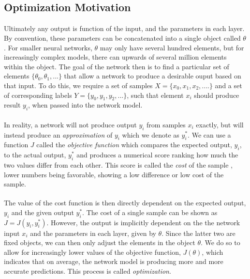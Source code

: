 \documentclass[12pt,letterpaper]{article}
\begin{document}
\subsection{Optimization Motivation}

\paragraph*{}Ultimately any output is function of the input, and the parameters in each layer. By convention, these parameters can be concatenated into a single object called $\theta$. For smaller neural networks, $\theta$ may only have several hundred elements, but for increasingly complex models, there can upwards of several million elements within the object. The goal of the network then is to find a particular set of elements $\{ \theta_0 , \theta_1 , ... \}$ that allow a network to produce a desirable ouput based on that input. To do this, we require a set of samples $X = \{x_0,x_1,x_2,....\}$ and a set of corresponding labels 
$Y = \{y_0,y_1,y_2,...\}$, such that element $x_i$ should produce result $y_i$, when passed into the network model. 

\paragraph*{}In reality, a network will not produce output $y_i$ from samples $x_i$ exactly, but will instead produce an \textit{approximation} of $y_i$ which we denote as $y_i^*$. We can use a function $J$ called the \textit{objective function} which compares the expected output, $y_i$, to the actual output, $y_i^*$ and produces a numerical score ranking how much the two values differ from each other. This score is called the \textit{cost} of the sample \cite{James}, lower numbers being favorable, showing a low difference or low cost of the sample.

\paragraph*{}The value of the cost function is then directly dependent on the expected output, $y_i$ and the given output $y_i^*$. The cost of a single sample can be shown as $J = J( y_i , y_i^* )$. However, the output is implicitly dependent on the the network input $x_i$ and the parameters in each layer, given by $\theta$. Since the latter two are fixed objects, we can then only adjust the elements in the object $\theta$. We do so to allow for increasingly lower values of the objective function, $J(\theta)$, which indicates that on average, the network model is producing more and more accurate predictions. This process is called \textit{optimization}. 
\end{document}
